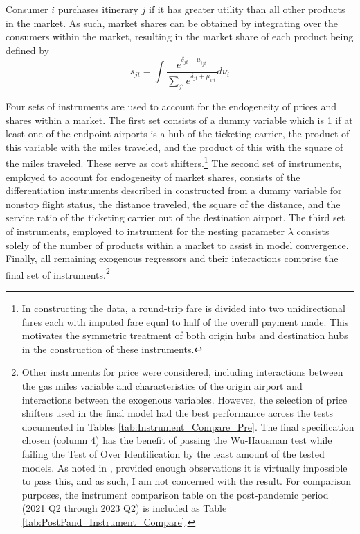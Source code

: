 \documentclass{article}
\begin{document}
	Consumer $i$ purchases itinerary $j$ if it has greater utility than all other products in the market. As such, market shares can be obtained by integrating over the consumers within the market, resulting in the market share of each product being defined by \[s_{jt} = \int \frac{e^{\delta_{jt} + \mu_{ijt}}}{\sum_{j'} e^{\delta_{jt} + \mu_{ijt}}} d{\nu_{i}}\]
	
	 Four sets of instruments are used to account for the endogeneity of prices and shares within a market. The first set consists of a dummy variable which is 1 if at least one of the endpoint airports is a hub of the ticketing carrier, the product of this variable with the miles traveled, and the product of this with the square of the miles traveled. These serve as cost shifters.\footnote{In constructing the data, a round-trip fare is divided into two unidirectional fares each with imputed fare equal to half of the overall payment made. This motivates the symmetric treatment of both origin hubs and destination hubs in the construction of these instruments.} The second set of instruments, employed to account for endogeneity of market shares, consists of the differentiation instruments described in \citet{gandhi_measuring_2019} constructed from a dummy variable for nonstop flight status, the distance traveled, the square of the distance, and the service ratio of the ticketing carrier out of the destination airport. The third set of instruments, employed to instrument for the nesting parameter $\lambda$ consists solely of the number of products within a market to assist in model convergence. Finally, all remaining exogenous regressors and their interactions comprise the final set of instruments.\footnote{Other instruments for price were considered, including interactions between the gas miles variable and characteristics of the origin airport and interactions between the exogenous variables. However, the selection of price shifters used in the final model had the best performance across the tests documented in Tables \ref{tab:Instrument_Compare_Pre}. The final specification chosen (column 4) has the benefit of passing the Wu-Hausman test while failing the Test of Over Identification by the least amount of the tested models. As noted in \citet{nevo_measuring_2001}, provided enough observations it is virtually impossible to pass this, and as such, I am not concerned with the result. For comparison purposes, the instrument comparison table on the post-pandemic period (2021 Q2 through 2023 Q2) is included as Table \ref{tab:PostPand_Instrument_Compare}.}
	
\end{document}
